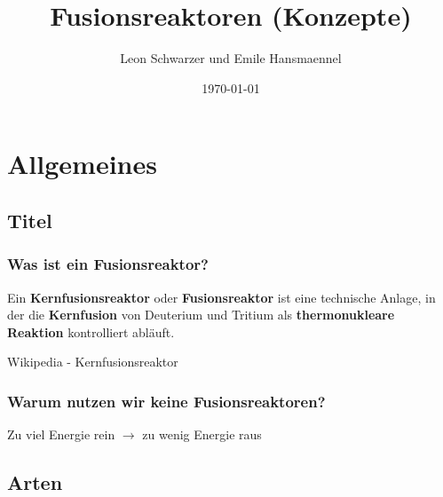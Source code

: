 \documentclass[aspectratio=169]{beamer}
\title{Fusionsreaktoren (Konzepte)}
\subtitle{}
\author{Leon Schwarzer und Emile Hansmaennel}
\institute{Theodor-Fliedner-Gymnasium}
\date{\today}
\begin{document}
  \begin{frame}
    \titlepage
  \end{frame}

  \section{Allgemeines}
    \subsection{Titel}

      \begin{frame}
        \frametitle{Was ist ein Fusionsreaktor?}
        Ein \textbf{Kernfusionsreaktor} oder \textbf{Fusionsreaktor} ist eine
        technische Anlage, in der die \textbf{Kernfusion} von Deuterium und Tritium als
        \textbf{thermonukleare Reaktion} kontrolliert abläuft.
        \par
        \raggedleft
        Wikipedia - Kernfusionsreaktor
      \end{frame}

      \begin{frame}
        \frametitle{Warum nutzen wir keine Fusionsreaktoren?}
        \center
        Zu viel Energie rein \( \rightarrow \) zu wenig Energie raus
      \end{frame}

    \subsection{Arten}
\end{document}
